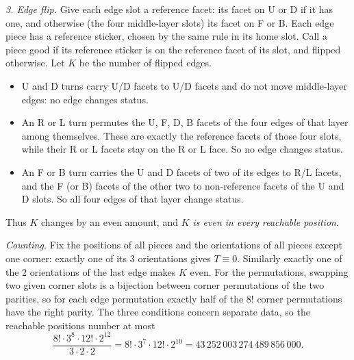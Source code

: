 \emph{3. Edge flip.} Give each edge slot a reference facet: its facet on U or D if it has one, and otherwise (the four middle-layer slots) its facet on F or B. Each edge piece has a reference sticker, chosen by the same rule in its home slot. Call a piece good if its reference sticker is on the reference facet of its slot, and flipped otherwise. Let $K$ be the number of flipped edges.
\begin{itemize}
\item U and D turns carry U/D facets to U/D facets and do not move middle-layer edges: no edge changes status.
\item An R or L turn permutes the U, F, D, B facets of the four edges of that layer among themselves. These are exactly the reference facets of those four slots, while their R or L facets stay on the R or L face. So no edge changes status.
\item An F or B turn carries the U and D facets of two of its edges to R/L facets, and the F (or B) facets of the other two to non-reference facets of the U and D slots. So all four edges of that layer change status.
\end{itemize}
Thus $K$ changes by an even amount, and \emph{$K$ is even in every reachable position}.

\emph{Counting.} Fix the positions of all pieces and the orientations of all pieces except one corner: exactly one of its $3$ orientations gives $T\equiv0$. Similarly exactly one of the $2$ orientations of the last edge makes $K$ even. For the permutations, swapping two given corner slots is a bijection between corner permutations of the two parities, so for each edge permutation exactly half of the $8!$ corner permutations have the right parity. The three conditions concern separate data, so the reachable positions number at most
\[\dfrac{8!\cdot3^8\cdot12!\cdot2^{12}}{3\cdot2\cdot2}=8!\cdot3^7\cdot12!\cdot2^{10}=\boxed{43\,252\,003\,274\,489\,856\,000}.\]

